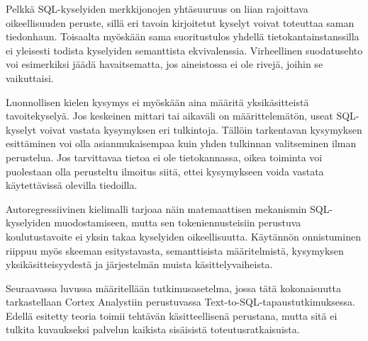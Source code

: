 Pelkkä SQL-kyselyiden merkkijonojen yhtäsuuruus
on liian rajoittava oikeellisuuden peruste,
sillä eri tavoin kirjoitetut kyselyt voivat
toteuttaa saman tiedonhaun. Toisaalta myöskään
sama suoritustulos yhdellä tietokantainstanssilla
ei yleisesti todista kyselyiden semanttista
ekvivalenssia. Virheellinen suodatusehto voi
esimerkiksi jäädä havaitsematta, jos aineistossa
ei ole rivejä, joihin se vaikuttaisi.

Luonnollisen kielen kysymys ei myöskään aina määritä
yksikäsitteistä tavoitekyselyä. Jos keskeinen mittari
tai aikaväli on määrittelemätön, useat SQL-kyselyt
voivat vastata kysymyksen eri tulkintoja. Tällöin
tarkentavan kysymyksen esittäminen voi olla
asianmukaisempaa kuin yhden tulkinnan valitseminen
ilman perustelua. Jos tarvittavaa tietoa ei ole
tietokannassa, oikea toiminta voi puolestaan olla
perusteltu ilmoitus siitä, ettei kysymykseen voida
vastata käytettävissä olevilla tiedoilla.

Autoregressiivinen kielimalli tarjoaa näin
matemaattisen mekanismin SQL-kyselyiden muodostamiseen,
mutta sen tokeniennusteisiin perustuva koulutustavoite
ei yksin takaa kyselyiden oikeellisuutta.
Käytännön onnistuminen riippuu myös skeeman
esitystavasta, semanttisista määritelmistä,
kysymyksen yksikäsitteisyydestä ja järjestelmän
muista käsittelyvaiheista.

Seuraavassa luvussa määritellään tutkimusasetelma,
jossa tätä kokonaisuutta tarkastellaan Cortex Analystiin
perustuvassa Text-to-SQL-tapaustutkimuksessa.
Edellä esitetty teoria toimii tehtävän käsitteellisenä
perustana, mutta sitä ei tulkita kuvaukseksi palvelun
kaikista sisäisistä toteutusratkaisuista.

